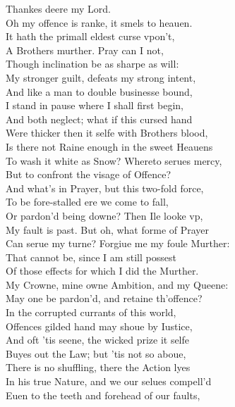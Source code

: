 \documentclass[a5paper,DIV=calc,11pt]{scrbook}
\begin{document}
\begin{drama*}
    \kingspeaks Thankes deere my Lord.\\
    Oh my offence is ranke, it smels to heauen.\\
    It hath the primall eldest curse vpon't,\\
    A Brothers murther. Pray can I not,\\
    Though inclination be as sharpe as will:\\
    My stronger guilt, defeats my strong intent,\\
    And like a man to double businesse bound,\\
    I stand in pause where I shall first begin,\\
    And both neglect; what if this cursed hand\\
    Were thicker then it selfe with Brothers blood,\\
    Is there not Raine enough in the sweet Heauens\\
    To wash it white as Snow? Whereto serues mercy,\\
    But to confront the visage of Offence?\\
    And what's in Prayer, but this two-fold force,\\
    To be fore-stalled ere we come to fall,\\
    Or pardon'd being downe? Then Ile looke vp,\\
    My fault is past. But oh, what forme of Prayer\\
    Can serue my turne? Forgiue me my foule Murther:\\
    That cannot be, since I am still possest\\
    Of those effects for which I did the Murther.\\
    My Crowne, mine owne Ambition, and my Queene:\\
    May one be pardon'd, and retaine th'offence?\\
    In the corrupted currants of this world,\\
    Offences gilded hand may shoue by Iustice,\\
    And oft 'tis seene, the wicked prize it selfe\\
    Buyes out the Law; but 'tis not so aboue,\\
    There is no shuffling, there the Action lyes\\
    In his true Nature, and we our selues compell'd\\
    Euen to the teeth and forehead of our faults,\\

\end{drama*}
\end{document}
